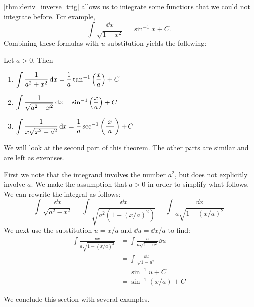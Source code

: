 \autoref{thm:deriv_inverse_trig} allows us to integrate some functions that we could not integrate before. For example,
\[\int\frac{\dd x}{\sqrt{1-x^2}}=\sin^{-1}x+C.\]
Combining these formulas with $u$-substitution yields the following:

{
\begin{theorem}\label{thm:int_inverse_trig}%
Let $a>0$.  Then
\begin{enumerate}
	\item	$\displaystyle\int\frac1{a^2+x^2}\operatorname{d}\! x=\frac1a\tan^{-1}\left(\frac xa\right) + C$
	\item	$\displaystyle\int\frac1{\sqrt{a^2-x^2}}\operatorname{d}\! x=\sin^{-1}\left(\frac xa\right)+C$
	\item	$\displaystyle\int\frac1{x\sqrt{x^2-a^2}}\operatorname{d}\! x=\frac1a\sec^{-1}\left(\frac{\left\lvert x \right\rvert}a\right)+C$
\end{enumerate}
\end{theorem}}

We will look at the second part of this theorem. The other parts are similar and are left as exercises.

First we note that the integrand involves the number $a^2$, but does not explicitly involve $a$. We make the assumption that $a>0$ in order to simplify what follows. We can rewrite the integral as follows:
\[\int\frac{\dd x}{\sqrt{a^2-x^2}}=\int\frac{\dd x}{\sqrt{a^2(1-(x/a)^2)}}=\int\frac{\dd x}{a\sqrt{1-(x/a)^2}}\]
We next use the substitution $u=x/a$ and $\dd u=\dd x/a$ to find: 
\begin{align*}
\int\frac{\dd x}{a\sqrt{1-(x/a)^2}}
&=\int\frac{a}{a\sqrt{1-u^2}}\dd u\\
&=\int \frac{\dd u}{\sqrt{1-u^2}}\\
&=\sin^{-1}u+C\\
&=\sin^{-1}(x/a)+C
\end{align*}

We conclude this section with several examples.

